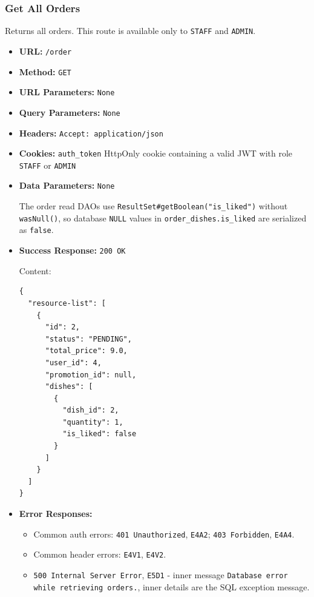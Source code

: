 \subsubsection*{Get All Orders}

Returns all orders. This route is available only to \texttt{STAFF} and \texttt{ADMIN}.

\begin{itemize}[nosep]
\item \textbf{URL:} \texttt{/order}

\item \textbf{Method:} \texttt{GET}

\item \textbf{URL Parameters:} \texttt{None}

\item \textbf{Query Parameters:} \texttt{None}

\item \textbf{Headers:} \texttt{Accept: application/json}

\item \textbf{Cookies:} \texttt{auth\_token} HttpOnly cookie containing a valid JWT with role \texttt{STAFF} or \texttt{ADMIN}

\item \textbf{Data Parameters:} \texttt{None}

The order read DAOs use \texttt{ResultSet\#getBoolean("is\_liked")} without \texttt{wasNull()}, so database \texttt{NULL} values in \texttt{order\_dishes.is\_liked} are serialized as \texttt{false}.

\item \textbf{Success Response:} \texttt{200 OK}

Content:

\begin{lstlisting}
{
  "resource-list": [
    {
      "id": 2,
      "status": "PENDING",
      "total_price": 9.0,
      "user_id": 4,
      "promotion_id": null,
      "dishes": [
        {
          "dish_id": 2,
          "quantity": 1,
          "is_liked": false
        }
      ]
    }
  ]
}
\end{lstlisting}

\item \textbf{Error Responses:}

\begin{itemize}[nosep]
\item Common auth errors: \texttt{401 Unauthorized}, \texttt{E4A2}; \texttt{403 Forbidden}, \texttt{E4A4}.
\item Common header errors: \texttt{E4V1}, \texttt{E4V2}.
\item \texttt{500 Internal Server Error}, \texttt{E5D1} - inner message \texttt{Database error while retrieving orders.}, inner details are the SQL exception message.
\end{itemize}

\end{itemize}

